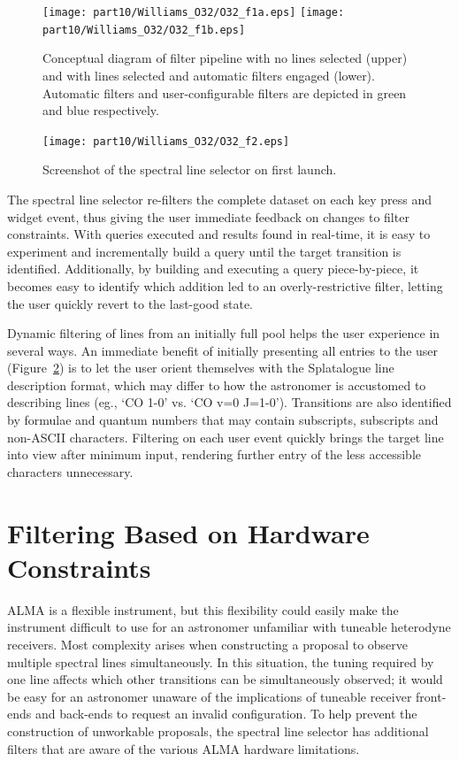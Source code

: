 \begin{figure}
	\texttt{[image: part10/Williams\_O32/O32\_f1a.eps]}
	\texttt{[image: part10/Williams\_O32/O32\_f1b.eps]}
	\caption{Conceptual diagram of filter pipeline with no lines selected (upper) and with lines selected and automatic filters engaged (lower). Automatic filters and user-configurable filters are depicted in green and blue respectively.}
	\label{fig:pipeline}
\end{figure}

\begin{figure}
	\texttt{[image: part10/Williams\_O32/O32\_f2.eps]}
	\caption{Screenshot of the spectral line selector on first launch.}
	\label{fig:Wscreenshot}
\end{figure}

The spectral line selector re-filters the complete dataset on each key press and widget event, thus giving the user immediate feedback on changes to filter constraints. With queries executed and results found in real-time, it is easy to experiment and incrementally build a query until the target transition is identified. Additionally, by building and executing a query piece-by-piece, it becomes easy to identify which addition led to an overly-restrictive filter, letting the user quickly revert to the last-good state.

Dynamic filtering of lines from an initially full pool helps the user experience in several ways. An immediate benefit of initially presenting all entries to the user (Figure~\ref{fig:Wscreenshot}) is to let the user orient themselves with the Splatalogue line description format, which may differ to how the astronomer is accustomed to describing lines (eg., `CO 1-0' vs. `CO v=0 J=1-0'). Transitions are also identified by formulae and quantum numbers that may contain subscripts, subscripts and non-ASCII characters. Filtering on each user event quickly brings the target line into view after minimum input, rendering further entry of the less accessible characters unnecessary.

\section{Filtering Based on Hardware Constraints}
\label{sec:hardware filters}
ALMA is a flexible instrument, but this flexibility could easily make the instrument difficult to use for an astronomer unfamiliar with tuneable heterodyne receivers. Most complexity arises when constructing a proposal to observe multiple spectral lines simultaneously. In this situation, the tuning required by one line affects which other transitions can be simultaneously observed; it would be easy for an astronomer unaware of the implications of tuneable receiver front-ends and back-ends to request an invalid configuration. To help prevent the construction of unworkable proposals, the spectral line selector has additional filters that are aware of the various ALMA hardware limitations. 

